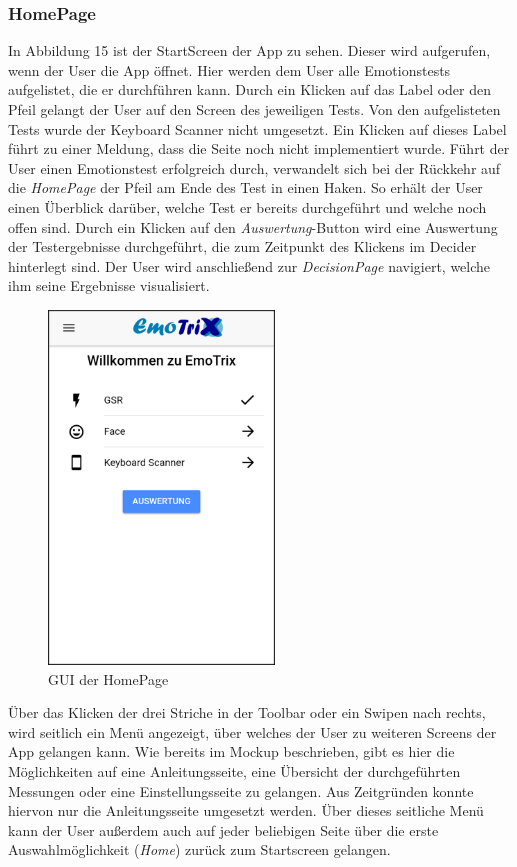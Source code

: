 \subsubsection{HomePage}
In Abbildung 15 ist der StartScreen der App zu sehen. Dieser wird aufgerufen, wenn der User die App öffnet. Hier werden dem User alle Emotionstests aufgelistet, die er durchführen kann. Durch ein Klicken auf das Label oder den Pfeil gelangt der User auf den Screen des jeweiligen Tests. Von den aufgelisteten Tests wurde der Keyboard Scanner nicht umgesetzt. Ein Klicken auf dieses Label führt zu einer Meldung, dass die Seite noch nicht implementiert wurde. \newline
Führt der User einen Emotionstest erfolgreich durch, verwandelt sich bei der Rückkehr auf die \textit{HomePage} der Pfeil am Ende des Test in einen Haken. So erhält der User einen Überblick darüber, welche Test er bereits durchgeführt und welche noch offen sind. \newline
Durch ein Klicken auf den \textit{Auswertung}-Button wird eine Auswertung der Testergebnisse durchgeführt, die zum Zeitpunkt des Klickens im Decider hinterlegt sind. Der User wird anschließend zur \textit{DecisionPage} navigiert, welche ihm seine Ergebnisse visualisiert. \newline
\begin{figure}[h]
	\centering
	\includegraphics[width=6cm]{Bilder/homepage.png}
	\caption[GUI der HomePage]{GUI der HomePage}
\end{figure}%
\newline
Über das Klicken der drei Striche in der Toolbar oder ein Swipen nach rechts, wird seitlich ein Menü angezeigt, über welches der User zu weiteren Screens der App gelangen kann. Wie bereits im Mockup beschrieben, gibt es hier die Möglichkeiten auf eine Anleitungsseite, eine Übersicht der durchgeführten Messungen oder eine Einstellungsseite zu gelangen. Aus Zeitgründen konnte hiervon nur die Anleitungsseite umgesetzt werden. Über dieses seitliche Menü kann der User außerdem auch auf jeder beliebigen Seite über die erste Auswahlmöglichkeit (\textit{Home}) zurück zum Startscreen gelangen.
